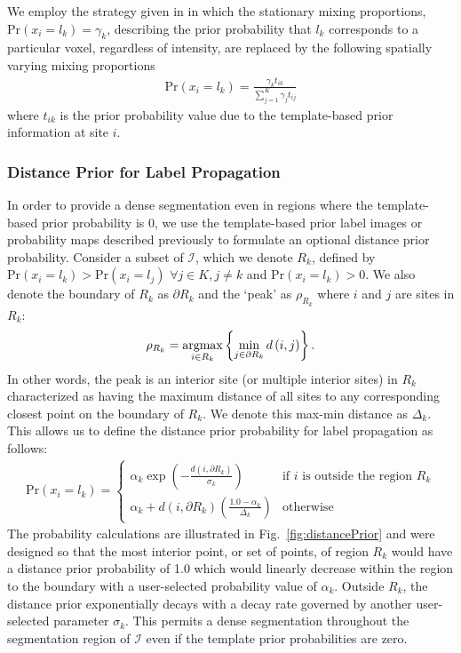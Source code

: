 \documentclass[11pt,english]{article}
\newcommand{\argmax}{\operatornamewithlimits{argmax}}
\begin{document}
We employ the strategy given in \cite{Ashburner2005} in which the stationary mixing proportions, $\mathrm{Pr}(x_i = l_k) = \gamma_k$, describing the prior probability that $l_k$ corresponds to a particular voxel, regardless of intensity, are replaced by the following spatially varying mixing proportions
\begin{align}
\mathrm{Pr}(x_i = l_k) = \frac{\gamma_k t_{ik}}{\sum_{j=1}^K\gamma_j t_{ij}}
\end{align}
where $t_{ik}$ is the prior probability value due to the template-based prior information at site $i$.

\subsubsection{Distance Prior for Label Propagation}

In order to provide a dense segmentation even in regions where the template-based prior probability is 0, we use the template-based prior label images or probability maps described previously to formulate an optional distance prior probability.
Consider a subset of $\mathcal{I}$, which we denote $R_k$, defined by $\mathrm{Pr}(x_i = l_k) > \mathrm{Pr}(x_i = l_j) \,\,\forall j \in K, j \neq k$ and $\mathrm{Pr}(x_i = l_k) > 0$. 
We also denote the boundary of $R_k$ as $\partial R_k$ and the `peak' as $\rho_{R_k}$ where $i$ and $j$ are sites in $R_k$:
\begin{align}
  \rho_{R_k} = \argmax_{i \in R_k} \left\{ \min_{j \in \partial {R_k}} d\left(i,j\right)\right\}.
\end{align}
In other words, the peak is an interior site (or multiple interior sites) in $R_k$ characterized as having the maximum distance of all sites to any corresponding closest point on the boundary of $R_k$.  We denote this max-min distance as $\Delta_k$.  This allows us to define the distance prior probability for label propagation as follows:
\begin{align}\label{eq:prop}
  \mathrm{Pr}(x_i = l_k) = \left\{
                                               \begin{array}{ll}
                                                \alpha_k \exp \left( -\frac{d(i, \partial R_k)}{\sigma_k} \right) & \text{if } i \text{ is outside the region } R_k \\
                                                \alpha_k + d\left(i, \partial R_k\right)\left(\frac{1.0 - \alpha_k}{\Delta_k}\right) & \text{otherwise}
                                                \end{array}
                                                \right.
\end{align}
The probability calculations are illustrated in Fig.~\ref{fig:distancePrior} and were designed so that the most interior point, or set of points, of region $R_k$ would have a distance prior probability of 1.0 which would linearly decrease within the region to the boundary with a user-selected probability value of $\alpha_k$.  Outside $R_k$, the distance prior exponentially decays with a decay rate governed by another user-selected parameter $\sigma_k$.  This permits a dense segmentation throughout the segmentation region of $\mathcal{I}$ even if the template prior probabilities are zero. 
\end{document}
